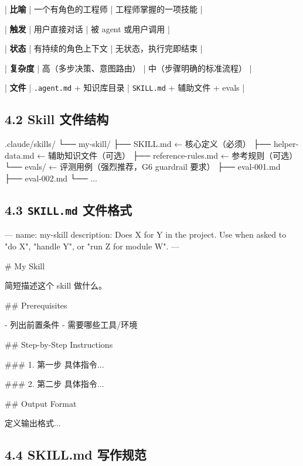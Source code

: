 | \textbf{比喻} | 一个有角色的工程师 | 工程师掌握的一项技能 |

| \textbf{触发} | 用户直接对话 | 被 agent 或用户调用 |

| \textbf{状态} | 有持续的角色上下文 | 无状态，执行完即结束 |

| \textbf{复杂度} | 高（多步决策、意图路由） | 中（步骤明确的标准流程） |

| \textbf{文件} | \texttt{.agent.md} + 知识库目录 | \texttt{SKILL.md} + 辅助文件 + evals |


\subsection{4.2 Skill 文件结构}

\begin{codeblock}
.claude/skills/
└── my-skill/
    ├── SKILL.md              ← 核心定义（必须）
    ├── helper-data.md        ← 辅助知识文件（可选）
    ├── reference-rules.md    ← 参考规则（可选）
    └── evals/                ← 评测用例（强烈推荐，G6 guardrail 要求）
        ├── eval-001.md
        ├── eval-002.md
        └── ...
\end{codeblock}

\subsection{4.3 \texttt{SKILL.md} 文件格式}

\begin{codeblock}
---
name: my-skill
description: Does X for Y in the project. Use when asked to "do X",
             "handle Y", or "run Z for module W".
---

# My Skill

简短描述这个 skill 做什么。

## Prerequisites

- 列出前置条件
- 需要哪些工具/环境

## Step-by-Step Instructions

### 1. 第一步
具体指令...

### 2. 第二步
具体指令...

## Output Format

定义输出格式...
\end{codeblock}

\subsection{4.4 SKILL.md 写作规范}


